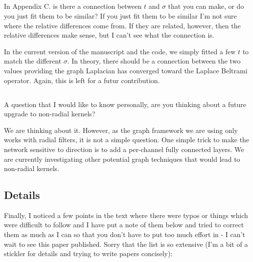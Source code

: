 \documentclass[12pt,a4paper]{article}
\newcommand{\TK}[1]{{\color{red}{TK: #1}}}
\newcommand{\todo}[1]{{\color[rgb]{.6,.1,.6}{TODO: #1}}}
\newcommand{\1}{\b{1}}              %
\newcommand{\0}{\b{0}}              %
\begin{document}
\subsection{}
\begin{mdframed}[style=comment]
In Appendix C. is there a connection between $t$ and $\sigma$ that you can make, or do you just fit them to be similar? If you just fit them to be similar I'm not sure where the relative differences come from. If they are related, however, then the relative differences make sense, but I can't see what the connection is.
\end{mdframed}

In the current version of the manuscript and the code, we simply fitted a few $t$ to match the different $\sigma$. In theory, there should be a connection between the two values providing the graph Laplacian has converged toward the Laplace Beltrami operator. Again, this is left for a futur contribution.

\subsection{}
\begin{mdframed}[style=comment]
A question that I would like to know personally, are you thinking about a future upgrade to non-radial kernels?
\end{mdframed}
We are thinking about it. However, as the graph framework we are using only works with radial filters, it is not a simple question. One simple trick to make the network sensitive to direction is to add a per-channel fully connected layers. We are currently investigating other potential graph techniques that would lead to non-radial kernels.


\subsection{Details}
\begin{mdframed}[style=comment]
Finally, I noticed a few points in the text where there were typos or things which were difficult to follow and I have put a note of them below and tried to correct them as much as I can so that you don't have to put too much effort in - I can't wait to see this paper published. Sorry that the list is so extensive (I'm a bit of a stickler for details and trying to write papers concisely):
\end{mdframed}
\todo{Assigned @tomek.
This reviewer really spend the time. Should we say something here?}
\TK{Thank you very much for taking the time for making these corrections. We find them very helpful and improving the quality of the paper.
We implemented most of them, see below.}
\end{document}
